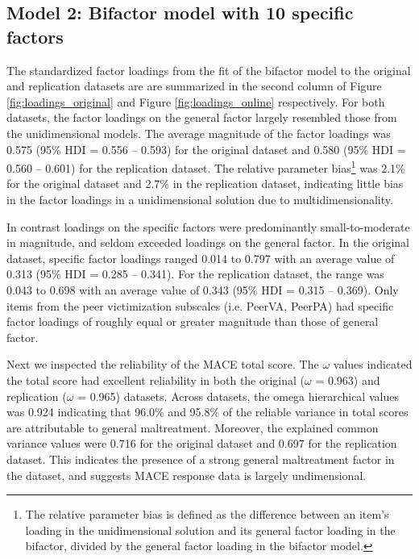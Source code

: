 \documentclass[letterpaper,man,natbib]{apa6}  %
\begin{document}
\subsection{Model 2: Bifactor model with 10 specific factors}

The standardized factor loadings from the fit of the bifactor model to the original and replication datasets are are summarized in the second column of Figure \ref{fig:loadings_original} and Figure \ref{fig:loadings_online} respectively. For both datasets, the factor loadings on the general factor largely resembled those from the unidimensional models. The average magnitude of the factor loadings was 0.575 (95\% HDI = 0.556 -- 0.593) for the original dataset and 0.580 (95\% HDI = 0.560 -- 0.601) for the replication dataset. The relative parameter bias\footnote{The relative parameter bias is defined as the difference between an item’s loading in the unidimensional solution and its general factor  loading in the bifactor, divided by the general factor loading in the bifactor model.} was 2.1\% for the original dataset and 2.7\% in the replication dataset, indicating little bias in the factor loadings in a unidimensional solution due to multidimensionality.  

In contrast loadings on the specific factors were predominantly small-to-moderate in magnitude, and seldom exceeded loadings on the general factor. In the original dataset, specific factor loadings ranged 0.014 to 0.797 with an average value of 0.313 (95\% HDI = 0.285 -- 0.341). For the replication dataset, the range was 0.043 to 0.698 with an average value of 0.343 (95\% HDI = 0.315 -- 0.369). Only items from the peer victimization subscales (i.e. PeerVA, PeerPA) had specific factor loadings of roughly equal or greater magnitude than those of general factor. 

Next we inspected the reliability of the MACE total score. The $\omega$ values indicated the total score had excellent reliability in both the original ($\omega$ = 0.963) and replication ($\omega$ = 0.965) datasets. Across datasets, the omega hierarchical values was 0.924 indicating that 96.0\% and 95.8\% of the reliable variance in total scores are attributable to general maltreatment. Moreover, the explained common variance values were 0.716 for the original dataset and 0.697 for the replication dataset. This indicates the presence of a strong general maltreatment factor in the dataset, and suggests MACE response data is largely undimensional. 
\end{document}

